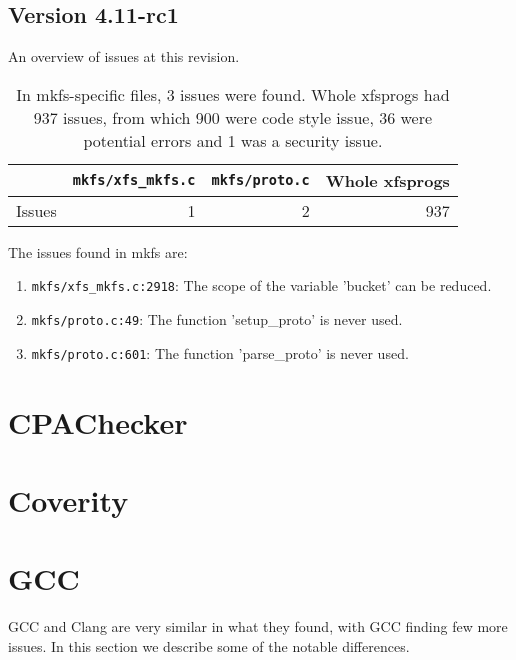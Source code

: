 \subsection{Version 4.11-rc1}
An overview of issues at this revision.
\begin{table}[h]
\begin{tabular}{|l||r|r||r|}
\hline
& {\tt mkfs/xfs\_mkfs.c} & {\tt mkfs/proto.c} & Whole xfsprogs \\
\hline
Issues & 1 & 2 & 937 \\
\hline
\end{tabular}
\caption{In mkfs-specific files, 3 issues were found. Whole
xfsprogs had 937 issues, from which 900 were code style issue, 36 were
potential errors and 1 was a security issue.}
\end{table}

The issues found in mkfs are:
\begin{enumerate}
	\item {\tt mkfs/xfs\_mkfs.c:2918}: The scope of the variable
		'bucket' can be reduced.
	\item {\tt mkfs/proto.c:49}: The function 'setup\_proto' is never
		used.
	\item {\tt mkfs/proto.c:601}: The function 'parse\_proto' is never
		used.
\end{enumerate}



\section{CPAChecker}\label{chap:results:cpachecker}

\section{Coverity}\label{chap:results:coverity}

\section{GCC}\label{chap:results:gcc}
GCC and Clang are very similar in what they found, with GCC finding few
more issues. In this section we describe some of the notable differences.

